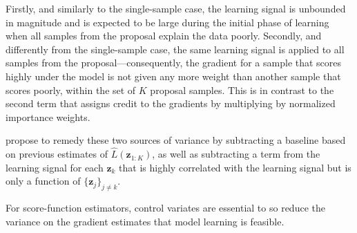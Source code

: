 Firstly, and similarly to the single-sample case, the learning signal is unbounded in magnitude and is expected to be large during the initial phase of learning when all samples from the proposal explain the data poorly. Secondly, and differently from the single-sample case, the same learning signal is applied to all samples from the proposal---consequently, the gradient for a sample that scores highly under the model is not given any more weight than another sample that scores poorly, within the set of $K$ proposal samples. This is in contrast to the second term that assigns credit to the gradients by multiplying by normalized importance weights.

\citet{MnihRezende2016} propose to remedy these two sources of variance by subtracting a baseline based on previous estimates of $\hat{L}(\mathbf{z}_{1:K})$, as well as subtracting a term from the learning signal for each $\mathbf{z}_k$ that is highly correlated with the learning signal but is only a function of $\{\mathbf{z}_j\}_{j\neq k}$.

For score-function estimators, control variates are essential to so reduce the variance on the gradient estimates that model learning is feasible.


